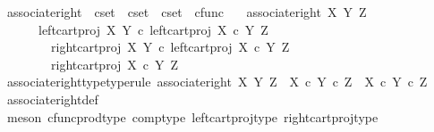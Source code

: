 \begin{isabellebody}
%
\isadelimdocument
%
\endisadelimdocument
{}\isamarkupfalse%
\ associate{\isacharunderscore}{\kern0pt}right\ {\isacharcolon}{\kern0pt}{\isacharcolon}{\kern0pt}\ {\isachardoublequoteopen}cset\ {\isasymRightarrow}\ cset\ {\isasymRightarrow}\ cset\ {\isasymRightarrow}\ cfunc{\isachardoublequoteclose}\ \isanewline
\ \ {\isachardoublequoteopen}associate{\isacharunderscore}{\kern0pt}right\ X\ Y\ Z\ {\isacharequal}{\kern0pt}\isanewline
\ \ \ \ {\isasymlangle}\isanewline
\ \ \ \ \ \ left{\isacharunderscore}{\kern0pt}cart{\isacharunderscore}{\kern0pt}proj\ X\ Y\ {\isasymcirc}\isactrlsub c\ left{\isacharunderscore}{\kern0pt}cart{\isacharunderscore}{\kern0pt}proj\ {\isacharparenleft}{\kern0pt}X\ {\isasymtimes}\isactrlsub c\ Y{\isacharparenright}{\kern0pt}\ Z{\isacharcomma}{\kern0pt}\ \isanewline
\ \ \ \ \ \ {\isasymlangle}\isanewline
\ \ \ \ \ \ \ \ right{\isacharunderscore}{\kern0pt}cart{\isacharunderscore}{\kern0pt}proj\ X\ Y\ {\isasymcirc}\isactrlsub c\ left{\isacharunderscore}{\kern0pt}cart{\isacharunderscore}{\kern0pt}proj\ {\isacharparenleft}{\kern0pt}X\ {\isasymtimes}\isactrlsub c\ Y{\isacharparenright}{\kern0pt}\ Z{\isacharcomma}{\kern0pt}\isanewline
\ \ \ \ \ \ \ \ right{\isacharunderscore}{\kern0pt}cart{\isacharunderscore}{\kern0pt}proj\ {\isacharparenleft}{\kern0pt}X\ {\isasymtimes}\isactrlsub c\ Y{\isacharparenright}{\kern0pt}\ Z\isanewline
\ \ \ \ \ \ {\isasymrangle}\isanewline
\ \ \ \ {\isasymrangle}{\isachardoublequoteclose}\isanewline
\isanewline
{}\isamarkupfalse%
\ associate{\isacharunderscore}{\kern0pt}right{\isacharunderscore}{\kern0pt}type{\isacharbrackleft}{\kern0pt}type{\isacharunderscore}{\kern0pt}rule{\isacharbrackright}{\kern0pt}{\isacharcolon}{\kern0pt}\ {\isachardoublequoteopen}associate{\isacharunderscore}{\kern0pt}right\ X\ Y\ Z\ {\isacharcolon}{\kern0pt}\ {\isacharparenleft}{\kern0pt}X\ {\isasymtimes}\isactrlsub c\ Y{\isacharparenright}{\kern0pt}\ {\isasymtimes}\isactrlsub c\ Z\ {\isasymrightarrow}\ X\ {\isasymtimes}\isactrlsub c\ {\isacharparenleft}{\kern0pt}Y\ {\isasymtimes}\isactrlsub c\ Z{\isacharparenright}{\kern0pt}{\isachardoublequoteclose}\isanewline
%
\isadelimproof
\ \ %
\endisadelimproof
%
\isatagproof
{}\isamarkupfalse%
\ associate{\isacharunderscore}{\kern0pt}right{\isacharunderscore}{\kern0pt}def\ \isamarkupfalse%
\ {\isacharparenleft}{\kern0pt}meson\ cfunc{\isacharunderscore}{\kern0pt}prod{\isacharunderscore}{\kern0pt}type\ comp{\isacharunderscore}{\kern0pt}type\ left{\isacharunderscore}{\kern0pt}cart{\isacharunderscore}{\kern0pt}proj{\isacharunderscore}{\kern0pt}type\ right{\isacharunderscore}{\kern0pt}cart{\isacharunderscore}{\kern0pt}proj{\isacharunderscore}{\kern0pt}type{\isacharparenright}{\kern0pt}%

\end{isabellebody}
